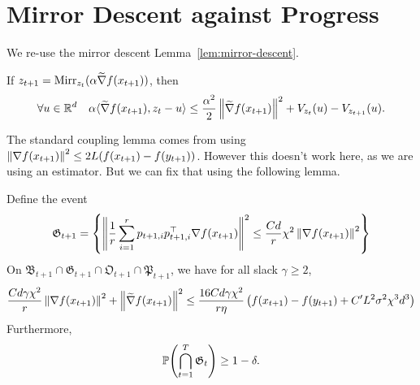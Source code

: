 \section{Mirror Descent against Progress}
We re-use the mirror descent Lemma~\ref{lem:mirror-descent}.
\begin{lemma}
    \label{lem:mixing-md}
    If $z_{t+1} = \Mirr_{z_t}(\alpha \widetilde{\grad} f(x_{t+1}))$, then
    \begin{align*}
        \forall u \in \R^d \quad \alpha \langle \widetilde{\grad} f(x_{t+1}), z_t-u \rangle \leq \frac{\alpha^2}{2} \mg{\widetilde{\grad} f(x_{t+1})}^2 + V_{z_t}(u) - V_{z_{t+1}}(u).
    \end{align*}
\end{lemma}

The standard coupling lemma comes from using $\mg{\grad f(x_{t+1})}^2 \leq 2L(f(x_{t+1}) - f(y_{t+1}))$. However this doesn't work here, as we are using an estimator. But we can fix that using the following lemma.
\begin{lemma}
    \label{lem:tilde-grad-bound}
    Define the event
    \begin{align*}
        \mathfrak G_{t+1} = \set{\mg{\frac 1r \sum_{i=1}^r p_{t+1,i}p_{t+1,i}^\top \grad f(x_{t+1})}^2 \leq \frac{Cd}{r} \chi^2 \mg{\grad f(x_{t+1})}^2}
    \end{align*}
    On $\mathfrak B_{t+1} \cap \mathfrak G_{t+1} \cap \mathfrak O_{t+1} \cap \mathfrak P_{t+1}$, we have for all slack $\gamma \geq 2$,
    \begin{align*}
        \frac{Cd\gamma\chi^2}{r} \mg{\grad f(x_{t+1})}^2 + \mg{\widetilde{\grad} f(x_{t+1})}^2 \leq \frac{16Cd \gamma \chi^2}{r \eta} \left(f(x_{t+1}) - f(y_{t+1}) + C'L^2 \sigma^2 \chi^3 d^3\right)
    \end{align*}
    Furthermore,
    \begin{align*}
        \P(\bigcap_{t=1}^{T} \mathfrak G_{t}) \geq 1-\delta.
    \end{align*}
\end{lemma}

